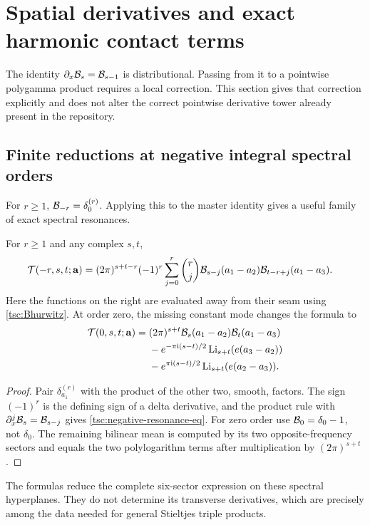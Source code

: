 \section{Spatial derivatives and exact harmonic contact terms}\label{tsc:contacts}
The identity $\partial_x\mathcal B_s=\mathcal B_{s-1}$ is distributional. Passing
from it to a pointwise polygamma product requires a local correction. This
section gives that correction explicitly and does not alter the correct
pointwise derivative tower already present in the repository.

\subsection{Finite reductions at negative integral spectral orders}
For $r\ge1$, $\mathcal B_{-r}=\delta_0^{(r)}$. Applying this to the master
identity gives a useful family of exact spectral resonances.
\begin{proposition}\label{tsc:negative-resonance}
For $r\ge1$ and any complex $s,t$,
\begin{align}\label{tsc:negative-resonance-eq}
 \mathcal T(-r,s,t;\mathbf a)
 ={}&(2\pi)^{s+t-r}(-1)^r
   \sum_{j=0}^r\binom rj
    \mathcal B_{s-j}(a_1-a_2)\mathcal B_{t-r+j}(a_1-a_3).
\end{align}
Here the functions on the right are evaluated away from their seam using
\eqref{tsc:Bhurwitz}. At order zero, the missing constant mode changes
the formula to
\begin{align}\label{tsc:zero-resonance}
 \mathcal T(0,s,t;\mathbf a)={}&(2\pi)^{s+t}
    \mathcal B_s(a_1-a_2)\mathcal B_t(a_1-a_3)\notag\\
 &-e^{-\pi\mathrm i(s-t)/2}\operatorname{Li}_{s+t}(e(a_3-a_2))\notag\\
 &-e^{\pi\mathrm i(s-t)/2}\operatorname{Li}_{s+t}(e(a_2-a_3)).
\end{align}
\end{proposition}
\begin{proof}
Pair $\delta_{a_1}^{(r)}$ with the product of the other two, smooth,
factors. The sign $(-1)^r$ is the defining sign of a delta derivative,
and the product rule with $\partial_x^j\mathcal B_s=\mathcal B_{s-j}$ gives
\eqref{tsc:negative-resonance-eq}. For zero order use
$\mathcal B_0=\delta_0-1$, not $\delta_0$. The remaining bilinear mean is
computed by its two opposite-frequency sectors and equals the two
polylogarithm terms after multiplication by $(2\pi)^{s+t}$.
\end{proof}
The formulas reduce the complete six-sector expression on these spectral
hyperplanes. They do not determine its transverse derivatives, which are
precisely among the data needed for general Stieltjes triple products.

